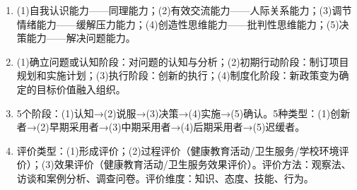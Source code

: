 {\begin{enumerate}[leftmargin=*, itemsep=5pt]
    \item (1)自我认识能力——同理能力；(2)有效交流能力——人际关系能力；(3)调节情绪能力——缓解压力能力；(4)创造性思维能力——批判性思维能力；(5)决策能力——解决问题能力。

    \item (1)确立问题或认知阶段：对问题的认知与分析；(2)初期行动阶段：制订项目规划和实施计划；(3)执行阶段：创新的执行；(4)制度化阶段：新政策变为确定的目标价值融入组织。

    \item 5个阶段：(1)认知→(2)说服→(3)决策→(4)实施→(5)确认。5种类型：(1)创新者→(2)早期采用者→(3)中期采用者→(4)后期采用者→(5)迟缓者。

    \item 评价类型：(1)形成评价；(2)过程评价（健康教育活动/卫生服务/学校环境评价）；(3)效果评价（健康教育活动/卫生服务效果评价）。评价方法：观察法、访谈和案例分析、调查问卷。评价维度：知识、态度、技能、行为。
\end{enumerate}
}

\newpage
